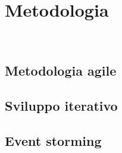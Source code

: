 \chapter{Metodologia}
\label{cap:metodologia}

\\

\section{Metodologia agile}
\label{sec:metodologia-agile}

\section{Sviluppo iterativo}
\label{sec:sviluppo-iterativo}

\section{Event storming}
\label{sec:event-storming}










